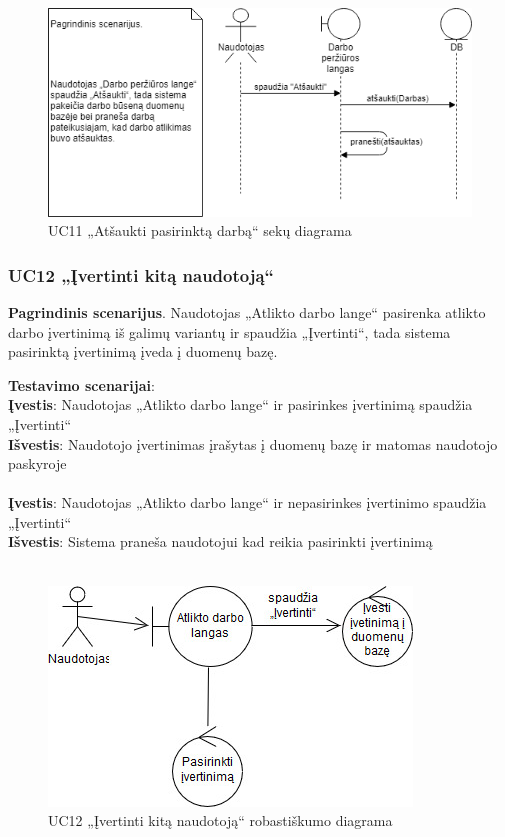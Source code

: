 \documentclass{VUMIFPSbakalaurinis}
\begin{document}
\begin{figure}[H]
	\centering
	\includegraphics[scale=0.6]{img/Sequence/SD11}
	\caption{UC11 „Atšaukti pasirinktą darbą“ sekų diagrama}
	\label{img:uc11seq}
\end{figure}

\subsubsection{UC12 „Įvertinti kitą naudotoją“}
\textbf{Pagrindinis scenarijus}. Naudotojas „Atlikto darbo lange“ pasirenka atlikto darbo įvertinimą iš galimų variantų ir spaudžia „Įvertinti“, tada sistema pasirinktą įvertinimą įveda į duomenų bazę.
\par \textbf{Testavimo scenarijai}:\\
\textbf{Įvestis}: Naudotojas  „Atlikto darbo lange“ ir pasirinkes įvertinimą spaudžia „Įvertinti“\\
\textbf{Išvestis}: Naudotojo įvertinimas įrašytas į duomenų bazę ir matomas naudotojo paskyroje\\ \\
\textbf{Įvestis}:  Naudotojas  „Atlikto darbo lange“ ir nepasirinkes įvertinimo spaudžia „Įvertinti“\\
\textbf{Išvestis}: Sistema praneša naudotojui kad reikia pasirinkti įvertinimą\\ \\

\begin{figure}[H]
	\centering
	\includegraphics[scale=0.6]{img/Robustness/UC12}
	\caption{UC12 „Įvertinti kitą naudotoją“ robastiškumo diagrama}
	\label{img:uc12rob}
\end{figure}
\end{document}
